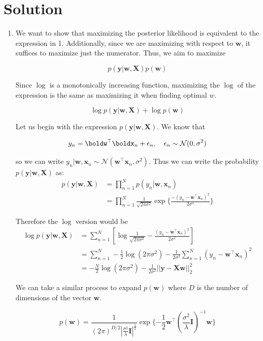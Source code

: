 \documentclass[submit]{../harvardml}
\newenvironment{solution}
  {\color{blue}\section*{Solution}}
{}
\begin{document}
\newpage
\begin{solution}
	\begin{enumerate}
	    \item We want to show that maximizing the posterior likelihood is equivalent to the expression in 1. Additionally, since we are maximizing with respect to $\bm w$, it suffices to maximize just the numerator. Thus, we aim to maximize

        \[
        p(\bm y|\bm w, \bm X)p(\bm w)
        \]

        Since $\log$ is a monotonically increasing function, maximizing the $\log$ of the expression is the same as maximizing it when finding optimal $w$.

        \[
        \log  p(\bm y|\bm w, \bm X) + \log p(\bm w)
        \]

        Let us begin with the expression $p(\bm y|\bm w, \bm X)$. We know that 

        \[y_n = \boldw^\top\boldx_n + \epsilon_n, \quad \epsilon_n \sim \mathcal{N}(0, \sigma^2)\]

        so we can write $y_n | \bm w, \bm x_n \sim \mathcal{N}(\bm w^\top \bm x_n, \sigma^2)$. Thus we can write the probability $p(\bm y | \bm w, \bm X)$ as:
        \begin{align*}
            p(\bm y | \bm w, \bm X) &= \prod_{n=1}^{N} p(y_n|\bm w,\bm x_n) \\
            &= \prod_{n=1}^{N} \frac{1}{\sqrt{2\pi \sigma^2}}\exp\{\frac{-(y_n - \bm w^\top \bm x_n)^2}{2\sigma^2}\}
        \end{align*}

        Therefore the $\log$ version would be
        \begin{align*}
            \log  p(\bm y|\bm w, \bm X) &= \sum_{n=1}^N \left[\log \frac{1}{\sqrt{2\pi \sigma^2}}-\frac{(y_n - \bm w^\top \bm x_n)^2}{2\sigma^2}\right]\\
            &= \sum_{n=1}^N -\frac{1}{2}\log(2\pi\sigma^2)-\frac{1}{2\sigma^2}\sum_{n=1}^N(y_n-\bm w^\top \bm x_n)^2 \\
            &= -\frac{N}{2}\log(2\pi\sigma^2)-\frac{1}{2\sigma^2}||\bm y-\bm X \bm w||^2_2
        \end{align*}

        We can take a similar process to expand $p(\bm w)$ where $D$ is the number of dimensions of the vector $\bm w$.

        \[
        p(\bm w) = \frac{1}{(2\pi)^{D/2}\left|\frac{\sigma^2}{\lambda}\bm I\right|^{\frac{1}{2}}}\exp\{-\frac{1}{2}\bm w^\top \left(\frac{\sigma^2}{\lambda}\bm I\right)^{-1}\bm w\}
        \]


\end{enumerate}
\end{solution}
\end{document}
